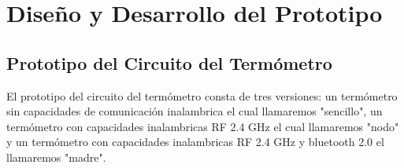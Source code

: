 \thispagestyle{plain}
\chapter{Diseño y Desarrollo del Prototipo}
	\section{Prototipo del Circuito del Termómetro}
		\par
			El prototipo del circuito del termómetro consta de tres versiones: un termómetro  sin capacidades de comunicación inalambrica el cual llamaremos "sencillo", un termómetro con capacidades inalambricas RF 2.4 GHz el cual llamaremos "nodo" y un termómetro con capacidades inalambricas RF 2.4 GHz y bluetooth 2.0 el llamaremos "madre".
			
		
		
		
		
		
		
		